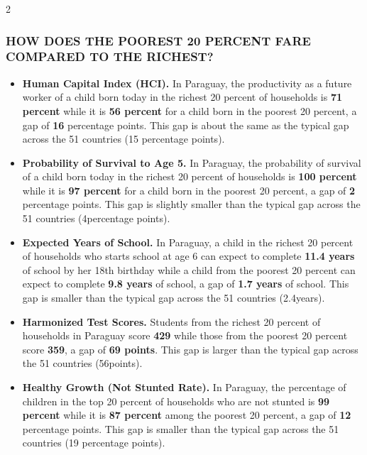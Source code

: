 \documentclass[8pt,]{article}
\begin{document}
\begin {multicols}{2}

\hypertarget{section}{%
\subsubsection{\texorpdfstring{\textcolor{bondiblue}{\textbf{H\small{OW DOES THE POOREST 20 PERCENT FARE COMPARED TO THE RICHEST?}}}}{}}\label{section}}

\begin{itemize}
\item
  \textbf{Human Capital Index (HCI).} In Paraguay, the productivity as a
  future worker of a child born today in the richest 20 percent of
  households is \textbf{71 percent} while it is \textbf{56 percent} for
  a child born in the poorest 20 percent, a gap of \textbf{16}
  percentage points. This gap is about the same as the typical gap
  across the 51 countries (15 percentage points).
\item
  \textbf{Probability of Survival to Age 5.} In Paraguay, the
  probability of survival of a child born today in the richest 20
  percent of households is \textbf{100 percent} while it is \textbf{97
  percent} for a child born in the poorest 20 percent, a gap of
  \textbf{2} percentage points. This gap is slightly smaller than the
  typical gap across the 51 countries (4percentage points).
\item
  \textbf{Expected Years of School.} In Paraguay, a child in the richest
  20 percent of households who starts school at age 6 can expect to
  complete \textbf{11.4 years} of school by her 18th birthday while a
  child from the poorest 20 percent can expect to complete \textbf{9.8
  years} of school, a gap of \textbf{1.7 years} of school. This gap is
  smaller than the typical gap across the 51 countries (2.4years).
\item
  \textbf{Harmonized Test Scores.} Students from the richest 20 percent
  of households in Paraguay score \textbf{429} while those from the
  poorest 20 percent score \textbf{359}, a gap of \textbf{69 points}.
  This gap is larger than the typical gap across the 51 countries
  (56points).
\item
  \textbf{Healthy Growth (Not Stunted Rate).} In Paraguay, the
  percentage of children in the top 20 percent of households who are not
  stunted is \textbf{99 percent} while it is \textbf{87 percent} among
  the poorest 20 percent, a gap of \textbf{12} percentage points. This
  gap is smaller than the typical gap across the 51 countries (19
  percentage points).
\end{itemize}


\end{multicols}
\end{document}
